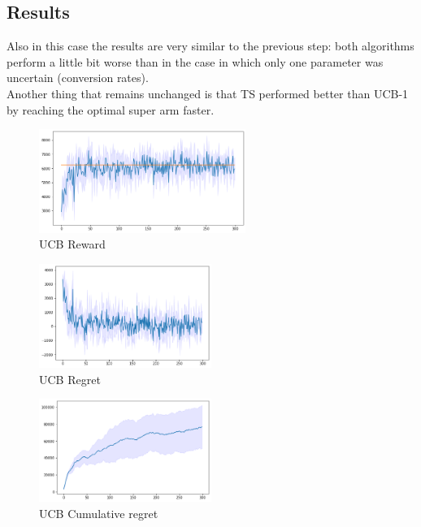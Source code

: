\subsection{Results}
Also in this case the results are very similar to the previous step: both algorithms perform a little bit worse than in the case in which only one parameter was uncertain (conversion rates).\\ Another thing that remains unchanged is that TS performed better than UCB-1 by reaching the optimal super arm faster.
\begin{figure}[ht]
    \begin{center}
    \includegraphics[width=0.6\textwidth]{img/ucb_reward5.png}
    \caption{UCB Reward}
    \label{fig:reward51}
    \end{center}
\end{figure}
\begin{multicols}{2}
    \begin{figure}[H]
        \begin{center}
        \includegraphics[width=0.5\textwidth]{img/ucb_regret5.png}
        \caption{UCB Regret}
        \label{fig:regret51}
        \end{center}
    \end{figure}
    \columnbreak
    \begin{figure}[H]
        \begin{center}
        \includegraphics[width=0.5\textwidth]{img/ucb_cum_regret5.png}
        \caption{UCB Cumulative regret}
        \label{fig:cum_reg51}
        \end{center}
    \end{figure}
\end{multicols}
